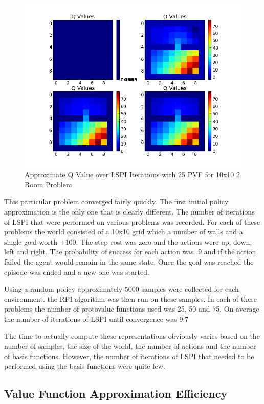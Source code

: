 \documentclass[12pt, letterpaper, final]{report}
\begin{document}
\FloatBarrier
\begin{figure}[h!]
\centering
\includegraphics[scale=.5]{images/debugging1.png}
\caption{Approximate Q Value over LSPI Iterations with 25 PVF for
  10x10 2 Room Problem}
\label{Qconvergence1}
\end{figure}
\FloatBarrier

This particular problem converged fairly quickly. The first initial
policy approximation is the only one that is clearly different. The
number of iterations of LSPI that were performed on various problems
was recorded. For each of these problems the world consisted of a
10x10 grid which a number of walls and a single goal worth +100. The
step cost was zero and the actions were up, down, left and right. The
probability of success for each action was .9 and if the action failed
the agent would remain in the same state. Once the goal was reached
the episode was ended and a new one was started.

Using a random policy approximately 5000 samples were collected for
each environment. the RPI algorithm was then run on these samples. In
each of these problems the number of protovalue functions used was 25,
50 and 75. On
average the number of iterations of LSPI until convergence was 9.7

The time to actually compute these representations obviously varies
based on the number of samples, the size of the world, the number of
actions and the number of basis functions. However, the number of
iterations of LSPI that needed to be performed using the basis
functions were quite few. 


\subsection*{Value Function Approximation Efficiency}
\end{document}
